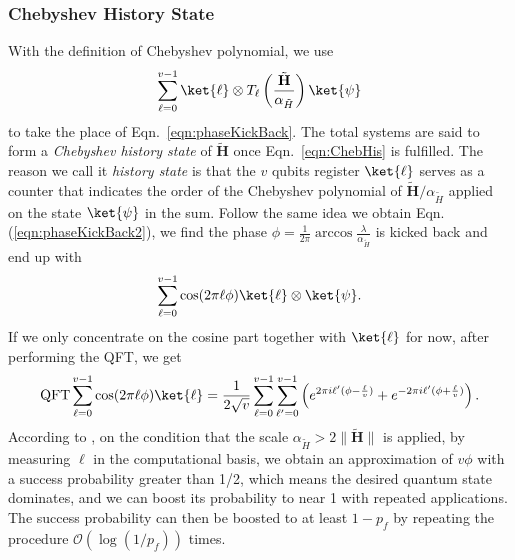 \subsubsection{Chebyshev History State}
With the definition of Chebyshev polynomial, we use 
\begin{equation}
    \sum_{\ell=0}^{v-1}\ket{\ell}\otimes T_{\ell}\left(\frac{\tilde{\textbf{H}}}{\alpha_{\tilde{H}}}\right)\ket{\psi}
    \label{eqn:ChebHis}
\end{equation}
to take the place of Eqn.~\ref{eqn:phaseKickBack}. The total systems are said to form a \textit{Chebyshev history state} of $\tilde{\textbf{H}}$ once Eqn.~\ref{eqn:ChebHis} is fulfilled. The reason we call it \textit{history state} is that the $v$ qubits register $\ket{\ell}$ serves as a counter that indicates the order of the Chebyshev polynomial of $\tilde{\textbf{H}}/\alpha_{\tilde{H}}$ applied on the state $\ket{\psi}$ in the sum. Follow the same idea we obtain Eqn. (\ref{eqn:phaseKickBack2}), we find the phase $\phi=\frac{1}{2\pi}\arccos\frac{\lambda}{\alpha_{\tilde{H}}}$ is kicked back and end up with 
\begin{equation}
    \sum_{\ell=0}^{v-1}\cos(2\pi \ell\phi)\ket{\ell}\otimes\ket{\psi}.
    \label{eqn:phaseKickBack3}
\end{equation}
If we only concentrate on the cosine part together with $\ket{\ell}$ for now, after performing the QFT, we get 
\begin{equation}
    \text{QFT}\sum_{\ell=0}^{v-1}\cos(2\pi\ell\phi)\ket{\ell}=\frac{1}{2\sqrt{v}}\sum_{\ell=0}^{v-1}\sum_{\ell^{\prime}=0}^{v-1}\left(e^{2\pi i\ell^{\prime}(\phi-\frac{\ell}{v})}+e^{-2\pi i\ell^{\prime}(\phi+\frac{\ell}{v})}\right).
\end{equation}
According to \cite{inproceedings}, on the condition that the scale $\alpha_{\tilde{H}}>2\|\tilde{\textbf{H}}\|$ is applied,  by measuring $\ell$ in the computational basis, we obtain an approximation of $v\phi$ with a success probability greater than 1/2, which means the desired quantum state dominates, and we can boost its probability to near 1 with repeated applications. The success probability can then be boosted to at least $1-p_f$ by repeating the procedure $\mathcal{O}(\log(1/p_f))$ times.

